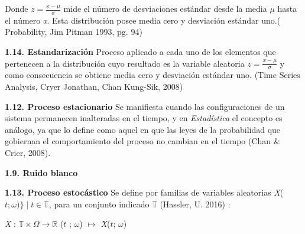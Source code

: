 Donde $z = \frac{x - \mu}{\sigma}$ mide el número de desviaciones estándar desde la media $\mu$ hasta el número \textit{x}. Esta distribución posee media cero y desviación estándar uno.( Probability, Jim Pitman 1993, pg. 94)
\newline

{
\noindent
\Large  \textbf{1.14. Estandarización} 
} 
\newline
Proceso aplicado a cada uno de los elementos que pertenecen a la distribución cuyo resultado es la variable aleatoria $z = \frac{x - \mu}{\sigma}$ y como consecuencia se obtiene media cero y desviación estándar uno. (Time Series Analysis, Cryer Jonathan, Chan Kung-Sik, 2008)
\newline

{
\noindent
\Large  \textbf{1.12. Proceso estacionario} 
}
\newline
Se manifiesta cuando las configuraciones de un sistema permanecen inalteradas en el tiempo, y en \textit{Estadística} el concepto es análogo, ya que lo define como \guillemotleft aquel en que las leyes de la probabilidad que gobiernan el comportamiento del proceso no cambian en el tiempo \guillemotright (Chan \& Crier, 2008).
\newpage


{
\noindent
\Large  \textbf{1.9. Ruido blanco} 
}


{
\noindent
\Large  \textbf{1.13. Proceso estocástico} 
}
\newline
Se define por familias de variables aleatorias  \textit{X}($\mathit{t}; \mathit{\omega})\} \mid \mathit{t} \in \mathbb{T}$, para un conjunto indicado $\mathbb{T}$ (Hassler, U. 2016) :

\begin{center}
\hspace{1.7cm}\textit{X} : $\mathbb{T} \times \mathit{\Omega} \rightarrow \mathbb{R} $\newline 
($\mathit{t}$ ; $\mathit{\omega}$) $\mapsto$ \textit{X}($\mathit{t}$; $\omega$)
\end{center}


